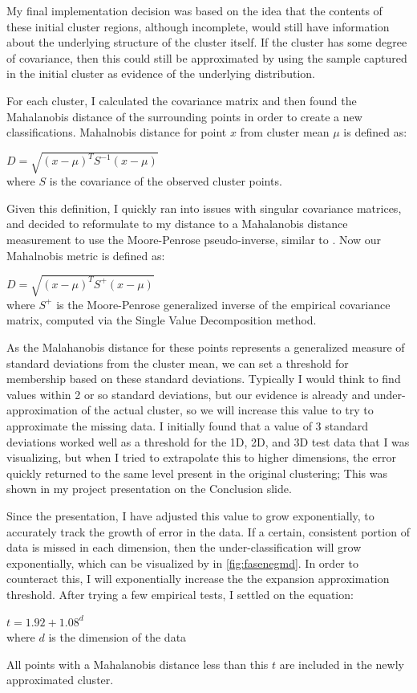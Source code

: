 \documentclass{sig-alternate-05-2015}
\begin{document}
My final implementation decision was based on the idea that the contents of these initial cluster regions, although incomplete, would still have information about the underlying structure of the cluster itself. If the cluster has some degree of covariance, then this could still be approximated by using the sample captured in the initial cluster as evidence of the underlying distribution.

For each cluster, I calculated the covariance matrix and then found the Mahalanobis distance of the surrounding points in order to create a new classifications. Mahalnobis distance for point $x$ from cluster mean $\mu$ is defined as:
\begin{center}
$D = \sqrt{(x-\mu)^TS^{-1}(x-\mu)}$ \\
where $S$ is the covariance of the observed cluster points.
\end{center}
Given this definition, I quickly ran into issues with singular covariance matrices, and decided to reformulate to my distance to a Mahalanobis distance measurement to use the Moore-Penrose pseudo-inverse, similar to \cite{Mahalnobis}. Now our Mahalnobis metric is defined as:
\begin{center}
$D = \sqrt{(x-\mu)^TS^+(x-\mu)}$ \\
where $S^+$ is the Moore-Penrose generalized inverse of the empirical covariance matrix, computed via the Single Value Decomposition method.
\end{center}
As the Malahanobis distance for these points represents a generalized measure of standard deviations from the cluster mean, we can set a threshold for membership based on these standard deviations. Typically I would think to find values within 2 or so standard deviations, but our evidence is already and under-approximation of the actual cluster, so we will increase this value to try to approximate the missing data. I initially found that a value of 3 standard deviations worked well as a threshold for the 1D, 2D, and 3D test data that I was visualizing, but when I tried to extrapolate this to higher dimensions, the error quickly returned to the same level present in the original clustering; This was shown in my project presentation on the Conclusion slide. 

Since the presentation, I have adjusted this value to grow exponentially, to accurately track the growth of error in the data. If a certain, consistent portion of data is missed in each dimension, then the under-classification will grow exponentially, which can be visualized by in \ref{fig:fasenegmd}. In order to counteract this, I will exponentially increase the the expansion approximation threshold. After trying a few empirical tests, I settled on the equation: \\
\begin{center}
$t = 1.92+1.08^d$ \\
where $d$ is the dimension of the data
\end{center}
All points with a Mahalanobis distance less than this $t$ are included in the newly approximated cluster.
\end{document}

